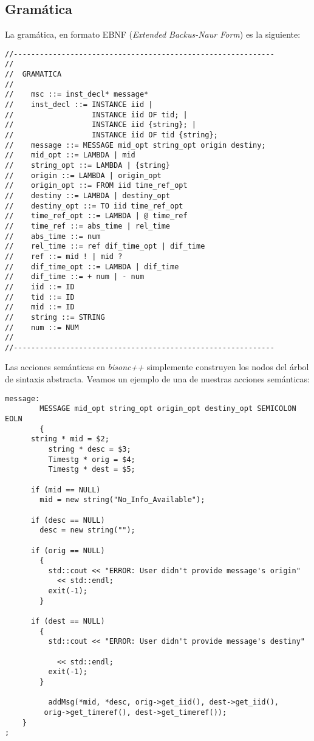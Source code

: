 \documentclass{article}
\begin{document}
\subsection{Gramática}
La gramática, en formato EBNF (\emph{Extended Backus-Naur Form}) es la siguiente:
\begin{verbatim}
//------------------------------------------------------------
//
//  GRAMATICA
//    
//    msc ::= inst_decl* message*
//    inst_decl ::= INSTANCE iid |
//                  INSTANCE iid OF tid; |
//                  INSTANCE iid {string}; |
//                  INSTANCE iid OF tid {string};               
//    message ::= MESSAGE mid_opt string_opt origin destiny;
//    mid_opt ::= LAMBDA | mid
//    string_opt ::= LAMBDA | {string}
//    origin ::= LAMBDA | origin_opt
//    origin_opt ::= FROM iid time_ref_opt
//    destiny ::= LAMBDA | destiny_opt
//    destiny_opt ::= TO iid time_ref_opt
//    time_ref_opt ::= LAMBDA | @ time_ref
//    time_ref ::= abs_time | rel_time
//    abs_time ::= num
//    rel_time ::= ref dif_time_opt | dif_time
//    ref ::= mid ! | mid ?
//    dif_time_opt ::= LAMBDA | dif_time
//    dif_time ::= + num | - num
//    iid ::= ID
//    tid ::= ID
//    mid ::= ID
//    string ::= STRING
//    num ::= NUM
//
//------------------------------------------------------------
\end{verbatim}

Las acciones semánticas en \emph{bisonc++} simplemente construyen los
nodos del árbol de sintaxis abstracta. Veamos un ejemplo de una de nuestras acciones semánticas:
\begin{verbatim}
message:
        MESSAGE mid_opt string_opt origin_opt destiny_opt SEMICOLON EOLN
        { 
	  string * mid = $2;
          string * desc = $3;
          Timestg * orig = $4;
          Timestg * dest = $5;
	  
	  if (mid == NULL)
	    mid = new string("No_Info_Available");
	  
	  if (desc == NULL)
	    desc = new string("");

	  if (orig == NULL)
	    {
	      std::cout << "ERROR: User didn't provide message's origin" 
			<< std::endl;
	      exit(-1);
	    }

	  if (dest == NULL)
	    {
	      std::cout << "ERROR: User didn't provide message's destiny" 

			<< std::endl;
	      exit(-1);
	    }
	  
          addMsg(*mid, *desc, orig->get_iid(), dest->get_iid(), 
		 orig->get_timeref(), dest->get_timeref());
	}
;
\end{verbatim}
\end{document}
